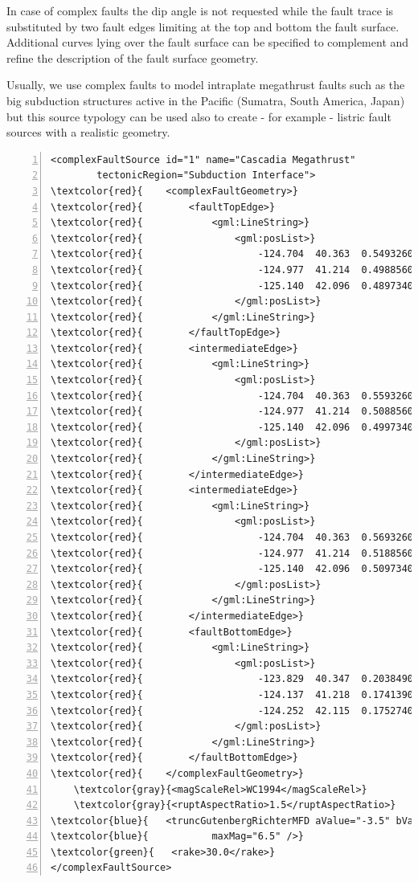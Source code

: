 In case of complex faults the dip angle is not requested while the fault
trace is substituted by two fault edges limiting at the top and bottom 
the fault surface. Additional curves lying over the fault surface can be 
specified to complement and refine the description of the fault surface 
geometry.

Usually, we use complex faults to model intraplate megathrust faults such 
as the big subduction structures active in the Pacific (Sumatra, South 
America, Japan) but this source typology can be used also to create - for
example - listric fault sources with a realistic geometry.
%
\begin{Verbatim}[frame=single, commandchars=\\\{\}, fontsize=\footnotesize,
    numbers=left, numbersep=2pt]
<complexFaultSource id="1" name="Cascadia Megathrust"
		tectonicRegion="Subduction Interface">
\textcolor{red}{    <complexFaultGeometry>}
\textcolor{red}{        <faultTopEdge>}
\textcolor{red}{            <gml:LineString>}
\textcolor{red}{                <gml:posList>}
\textcolor{red}{                    -124.704  40.363  0.5493260E+01}
\textcolor{red}{                    -124.977  41.214  0.4988560E+01}
\textcolor{red}{                    -125.140  42.096  0.4897340E+01}
\textcolor{red}{                </gml:posList>}
\textcolor{red}{            </gml:LineString>}
\textcolor{red}{        </faultTopEdge>}
\textcolor{red}{        <intermediateEdge>}
\textcolor{red}{            <gml:LineString>}
\textcolor{red}{                <gml:posList>}
\textcolor{red}{                    -124.704  40.363  0.5593260E+01}
\textcolor{red}{                    -124.977  41.214  0.5088560E+01}
\textcolor{red}{                    -125.140  42.096  0.4997340E+01}
\textcolor{red}{                </gml:posList>}
\textcolor{red}{            </gml:LineString>}
\textcolor{red}{        </intermediateEdge>}
\textcolor{red}{        <intermediateEdge>}
\textcolor{red}{            <gml:LineString>}
\textcolor{red}{                <gml:posList>}
\textcolor{red}{                    -124.704  40.363  0.5693260E+01}
\textcolor{red}{                    -124.977  41.214  0.5188560E+01}
\textcolor{red}{                    -125.140  42.096  0.5097340E+01}
\textcolor{red}{                </gml:posList>}
\textcolor{red}{            </gml:LineString>}
\textcolor{red}{        </intermediateEdge>}
\textcolor{red}{        <faultBottomEdge>}
\textcolor{red}{            <gml:LineString>}
\textcolor{red}{                <gml:posList>}
\textcolor{red}{                    -123.829  40.347  0.2038490E+02}
\textcolor{red}{                    -124.137  41.218  0.1741390E+02}
\textcolor{red}{                    -124.252  42.115  0.1752740E+02}
\textcolor{red}{                </gml:posList>}
\textcolor{red}{            </gml:LineString>}
\textcolor{red}{        </faultBottomEdge>}
\textcolor{red}{    </complexFaultGeometry>}
    \textcolor{gray}{<magScaleRel>WC1994</magScaleRel>}
    \textcolor{gray}{<ruptAspectRatio>1.5</ruptAspectRatio>}
\textcolor{blue}{   <truncGutenbergRichterMFD aValue="-3.5" bValue="1.0" minMag="5.0" }
\textcolor{blue}{			maxMag="6.5" />}
\textcolor{green}{   <rake>30.0</rake>}
</complexFaultSource>
\end{Verbatim}
